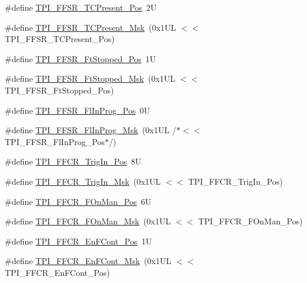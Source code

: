 \begin{DoxyCompactItemize}
\item 
\#define \mbox{\hyperlink{group___c_m_s_i_s___t_p_i_gad30fde0c058da2ffb2b0a213be7a1b5c}{T\+P\+I\+\_\+\+F\+F\+S\+R\+\_\+\+T\+C\+Present\+\_\+\+Pos}}~2U
\item 
\#define \mbox{\hyperlink{group___c_m_s_i_s___t_p_i_ga0d6bfd263ff2fdec72d6ec9415fb1135}{T\+P\+I\+\_\+\+F\+F\+S\+R\+\_\+\+T\+C\+Present\+\_\+\+Msk}}~(0x1\+U\+L $<$$<$ T\+P\+I\+\_\+\+F\+F\+S\+R\+\_\+\+T\+C\+Present\+\_\+\+Pos)
\item 
\#define \mbox{\hyperlink{group___c_m_s_i_s___t_p_i_gaedf31fd453a878021b542b644e2869d2}{T\+P\+I\+\_\+\+F\+F\+S\+R\+\_\+\+Ft\+Stopped\+\_\+\+Pos}}~1U
\item 
\#define \mbox{\hyperlink{group___c_m_s_i_s___t_p_i_ga1ab6c3abe1cf6311ee07e7c479ce5f78}{T\+P\+I\+\_\+\+F\+F\+S\+R\+\_\+\+Ft\+Stopped\+\_\+\+Msk}}~(0x1\+U\+L $<$$<$ T\+P\+I\+\_\+\+F\+F\+S\+R\+\_\+\+Ft\+Stopped\+\_\+\+Pos)
\item 
\#define \mbox{\hyperlink{group___c_m_s_i_s___t_p_i_ga542ca74a081588273e6d5275ba5da6bf}{T\+P\+I\+\_\+\+F\+F\+S\+R\+\_\+\+Fl\+In\+Prog\+\_\+\+Pos}}~0U
\item 
\#define \mbox{\hyperlink{group___c_m_s_i_s___t_p_i_ga63dfb09259893958962914fc3a9e3824}{T\+P\+I\+\_\+\+F\+F\+S\+R\+\_\+\+Fl\+In\+Prog\+\_\+\+Msk}}~(0x1\+U\+L /$\ast$$<$$<$ T\+P\+I\+\_\+\+F\+F\+S\+R\+\_\+\+Fl\+In\+Prog\+\_\+\+Pos$\ast$/)
\item 
\#define \mbox{\hyperlink{group___c_m_s_i_s___t_p_i_gaa7ea11ba6ea75b541cd82e185c725b5b}{T\+P\+I\+\_\+\+F\+F\+C\+R\+\_\+\+Trig\+In\+\_\+\+Pos}}~8U
\item 
\#define \mbox{\hyperlink{group___c_m_s_i_s___t_p_i_ga360b413bc5da61f751546a7133c3e4dd}{T\+P\+I\+\_\+\+F\+F\+C\+R\+\_\+\+Trig\+In\+\_\+\+Msk}}~(0x1\+U\+L $<$$<$ T\+P\+I\+\_\+\+F\+F\+C\+R\+\_\+\+Trig\+In\+\_\+\+Pos)
\item 
\#define \mbox{\hyperlink{group___c_m_s_i_s___t_p_i_gac57b0b588a37a870573560bc6316cbcc}{T\+P\+I\+\_\+\+F\+F\+C\+R\+\_\+\+F\+On\+Man\+\_\+\+Pos}}~6U
\item 
\#define \mbox{\hyperlink{group___c_m_s_i_s___t_p_i_ga7aeb30af62d04e852a55c3bd64c1bd2c}{T\+P\+I\+\_\+\+F\+F\+C\+R\+\_\+\+F\+On\+Man\+\_\+\+Msk}}~(0x1\+U\+L $<$$<$ T\+P\+I\+\_\+\+F\+F\+C\+R\+\_\+\+F\+On\+Man\+\_\+\+Pos)
\item 
\#define \mbox{\hyperlink{group___c_m_s_i_s___t_p_i_ga99e58a0960b275a773b245e2b69b9a64}{T\+P\+I\+\_\+\+F\+F\+C\+R\+\_\+\+En\+F\+Cont\+\_\+\+Pos}}~1U
\item 
\#define \mbox{\hyperlink{group___c_m_s_i_s___t_p_i_ga27d1ecf2e0ff496df03457a2a97cb2c9}{T\+P\+I\+\_\+\+F\+F\+C\+R\+\_\+\+En\+F\+Cont\+\_\+\+Msk}}~(0x1\+U\+L $<$$<$ T\+P\+I\+\_\+\+F\+F\+C\+R\+\_\+\+En\+F\+Cont\+\_\+\+Pos)
$$
\end{DoxyCompactItemize}
